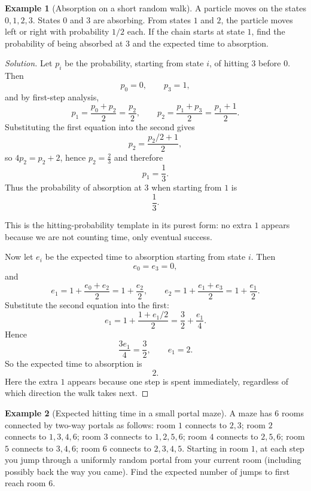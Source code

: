 \documentclass[11pt]{article}
\theoremstyle{definition}
\newtheorem{example}{Example}[section]
\begin{document}
\begin{example}[Absorption on a short random walk]
A particle moves on the states $0,1,2,3$. States $0$ and $3$ are absorbing. From states $1$ and $2$, the particle moves left or right with probability $1/2$ each. If the chain starts at state $1$, find the probability of being absorbed at $3$ and the expected time to absorption.
\end{example}

\begin{proof}[Solution]
Let $p_i$ be the probability, starting from state $i$, of hitting $3$ before $0$. Then
\[
p_0=0,
\qquad
p_3=1,
\]
and by first-step analysis,
\[
p_1=\frac{p_0+p_2}{2}=\frac{p_2}{2},
\qquad
p_2=\frac{p_1+p_3}{2}=\frac{p_1+1}{2}.
\]
Substituting the first equation into the second gives
\[
p_2=\frac{p_2/2+1}{2},
\]
so $4p_2=p_2+2$, hence $p_2=\frac23$ and therefore
\[
p_1=\frac13.
\]
Thus the probability of absorption at $3$ when starting from $1$ is
\[
\boxed{\frac13}.
\]

This is the hitting-probability template in its purest form: no extra $1$ appears because we are not counting time, only eventual success.

Now let $e_i$ be the expected time to absorption starting from state $i$. Then
\[
e_0=e_3=0,
\]
and
\[
e_1=1+\frac{e_0+e_2}{2}=1+\frac{e_2}{2},
\qquad
e_2=1+\frac{e_1+e_3}{2}=1+\frac{e_1}{2}.
\]
Substitute the second equation into the first:
\[
e_1=1+\frac{1+e_1/2}{2}=\frac32+\frac{e_1}{4}.
\]
Hence
\[
\frac{3e_1}{4}=\frac32,
\qquad
e_1=2.
\]
So the expected time to absorption is
\[
\boxed{2}.
\]
Here the extra $1$ appears because one step is spent immediately, regardless of which direction the walk takes next.
\end{proof}

\begin{example}[Expected hitting time in a small portal maze]
A maze has $6$ rooms connected by two-way portals as follows: room $1$ connects to $2,3$; room $2$ connects to $1,3,4,6$; room $3$ connects to $1,2,5,6$; room $4$ connects to $2,5,6$; room $5$ connects to $3,4,6$; room $6$ connects to $2,3,4,5$. Starting in room $1$, at each step you jump through a uniformly random portal from your current room (including possibly back the way you came). Find the expected number of jumps to first reach room $6$.
\end{example}
\end{document}
